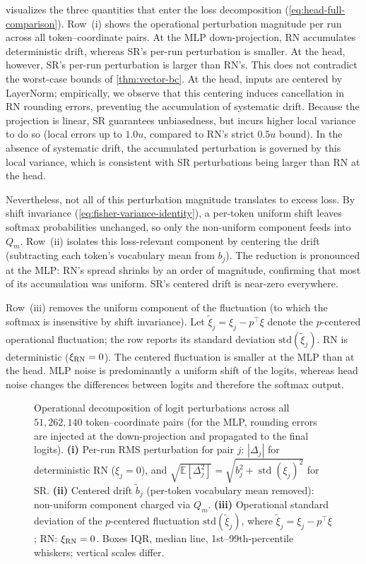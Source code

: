  visualizes the three quantities that enter the
loss decomposition (\cref{eq:head-full-comparison}). Row~(i) shows the
operational perturbation magnitude per run across all token--coordinate pairs.
At the MLP down-projection, RN accumulates deterministic drift, whereas SR's
per-run perturbation is smaller. At the head, however, SR's per-run perturbation
is larger than RN's. This does not contradict the worst-case bounds of
\cref{thm:vector-bc}. At the head, inputs are centered by LayerNorm;
empirically, we observe that this centering induces cancellation in RN rounding
errors, preventing the accumulation of systematic drift. Because the projection
is linear, SR guarantees unbiasedness, but incurs higher local variance to
do so (local errors up to $1.0u$, compared to RN's strict $0.5u$ bound). In the
absence of systematic drift, the accumulated perturbation is governed by this
local variance, which is consistent with SR perturbations being larger than RN
at the head.

Nevertheless, not all of this perturbation magnitude translates to excess loss.
By shift invariance (\cref{eq:fisher-variance-identity}), a per-token uniform
shift leaves softmax probabilities unchanged, so only the non-uniform
component feeds into $Q_m$. Row~(ii) isolates this loss-relevant component
by centering the drift (subtracting each token's vocabulary mean from $b_j$).
The reduction is pronounced at the MLP: RN's spread shrinks by an order
of magnitude, confirming that most of its accumulation was uniform.
SR's centered drift is near-zero everywhere.

Row~(iii) removes the uniform component of the fluctuation (to which the
softmax is insensitive by shift invariance). Let $\tilde\xi_j = \xi_j - p^\top\xi$
denote the $p$-centered operational fluctuation; the row reports its standard
deviation $\mathrm{std}(\tilde\xi_j)$. RN is deterministic
($\xi_{\mathrm{RN}}=0$). The centered fluctuation is smaller at the MLP than at
the head.
MLP noise is predominantly a uniform shift of the logits, whereas
head noise changes the differences between logits and therefore the softmax
output.
\begin{figure}[!htb]
  \centering
  \vspace{-1em}
  \caption{Operational decomposition of logit perturbations across all $51{,}262{,}140$ token--coordinate pairs (for the MLP, rounding errors are injected at the down-projection and propagated to the final logits).
  \textbf{(i)} Per-run RMS perturbation for pair $j$: $|\Delta_j|$ for deterministic RN ($\xi_j=0$), and $\sqrt{\mathbb{E}[\Delta_j^2]} = \sqrt{b_j^2 + \operatorname{std}(\xi_j)^2}$ for SR.
  \textbf{(ii)} Centered drift $\tilde b_j$ (per-token vocabulary mean removed): non-uniform component charged via $Q_m$.
  \textbf{(iii)} Operational standard deviation of the $p$-centered fluctuation $\mathrm{std}(\tilde\xi_j)$, where $\tilde\xi_j = \xi_j - p^\top\xi$; RN: $\xi_{\mathrm{RN}}=0$.
  Boxes IQR, median line, 1st--99th-percentile whiskers; vertical scales differ.}
  \label{fig:drift-distribution}
\end{figure}

